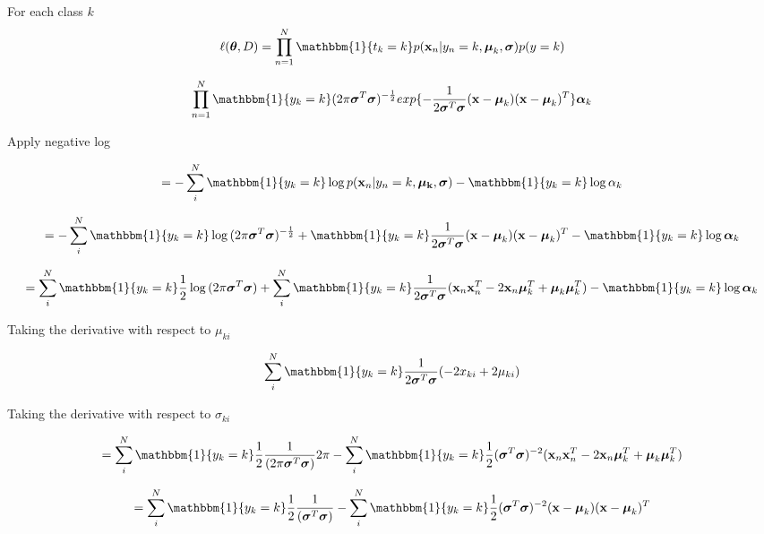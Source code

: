 \documentclass[12pt,letterpaper]{article} %
\newcommand{\bs}[1]{\bm{\mathrm{#1}}} %
\newcommand{\switch}[0]{\mathbbm{1}\{y_k=k\}}
\begin{document}
For each class $k$
\begin{equation*}
\ell(\bs{\theta},D) = \prod^N_{n=1}\mathbbm{1}\{t_k=k\}p(\bs{x}_n|y_n=k,\bs{\mu}_k,\bs{\sigma})p(y=k)
\end{equation*}


\begin{equation*}
\prod^N_{n=1}\switch(2\pi\bs{\sigma}^T\bs{\sigma})^{-\frac{1}{2}}exp\{-\frac{1}{2\bs{\sigma}^T\bs{\sigma}}(\bs{x}-\bs{\mu}_k)(\bs{x}-\bs{\mu}_k)^T\}\bs{\alpha}_k
\end{equation*}

Apply negative log

\begin{equation*}
= -\sum^N_i\switch\log{p(\bs{x}_n|y_n=k,\bs{\mu_k},\bs{\sigma})}-\switch\log{\alpha_k}
\end{equation*}

\begin{equation*}
 = -\sum^N_i\switch\log{(2\pi\bs{\sigma}^T\bs{\sigma})^{-\frac{1}{2}}} + \switch\frac{1}{2\bs{\sigma}^T\bs{\sigma}}(\bs{x}-\bs{\mu}_k)(\bs{x}-\bs{\mu}_k)^T-\switch\log{\bs{\alpha}_k}
\end{equation*}

\begin{equation*}
 =\sum^N_i\switch\frac{1}{2}\log{(2\pi\bs{\sigma}^T\bs{\sigma})}+ \sum^N_i\switch\frac{1}{2\bs{\sigma}^T\bs{\sigma}}(\bs{x}_n\bs{x}^T_n-2\bs{x}_n\bs{\mu}_k^T+\bs{\mu}_k\bs{\mu}_k^T)-\switch\log{\bs{\alpha}_k}
\end{equation*}

Taking the derivative with respect to $\mu_{ki}$ 

\begin{equation*}
  \sum^N_i\switch\frac{1}{2\bs{\sigma}^T\bs{\sigma}}(-2x_{ki}+2\mu_{ki})
\end{equation*}

Taking the derivative with respect to $\sigma_{ki}$ 

\begin{equation*}
=\sum^N_i\switch\frac{1}{2}\frac{1}{(2\pi\bs{\sigma}^T\bs{\sigma})}2\pi - \sum^N_i\switch\frac{1}{2}(\bs{\sigma}^T\bs{\sigma})^{-2}(\bs{x}_n\bs{x}^T_n-2\bs{x}_n\bs{\mu}_k^T+\bs{\mu}_k\bs{\mu}_k^T)
 \end{equation*}

\begin{equation*}
=\sum^N_i\switch\frac{1}{2}\frac{1}{(\bs{\sigma}^T\bs{\sigma})} - \sum^N_i\switch\frac{1}{2}(\bs{\sigma}^T\bs{\sigma})^{-2}(\bs{x}-\bs{\mu}_k)(\bs{x}-\bs{\mu}_k)^T
 \end{equation*}
 
\end{document}
